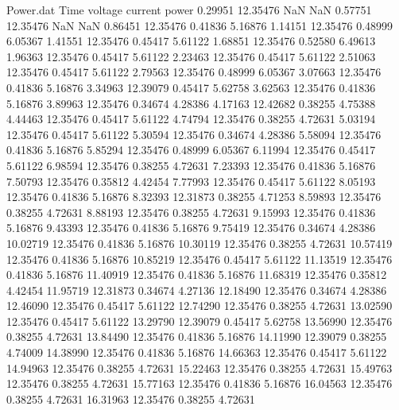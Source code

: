 \begin{filecontents}{Power.dat}
Time voltage current power
   0.29951   12.35476        NaN        NaN
   0.57751   12.35476        NaN        NaN
   0.86451   12.35476    0.41836    5.16876
   1.14151   12.35476    0.48999    6.05367
   1.41551   12.35476    0.45417    5.61122
   1.68851   12.35476    0.52580    6.49613
   1.96363   12.35476    0.45417    5.61122
   2.23463   12.35476    0.45417    5.61122
   2.51063   12.35476    0.45417    5.61122
   2.79563   12.35476    0.48999    6.05367
   3.07663   12.35476    0.41836    5.16876
   3.34963   12.39079    0.45417    5.62758
   3.62563   12.35476    0.41836    5.16876
   3.89963   12.35476    0.34674    4.28386
   4.17163   12.42682    0.38255    4.75388
   4.44463   12.35476    0.45417    5.61122
   4.74794   12.35476    0.38255    4.72631
   5.03194   12.35476    0.45417    5.61122
   5.30594   12.35476    0.34674    4.28386
   5.58094   12.35476    0.41836    5.16876
   5.85294   12.35476    0.48999    6.05367
   6.11994   12.35476    0.45417    5.61122
   6.98594   12.35476    0.38255    4.72631
   7.23393   12.35476    0.41836    5.16876
   7.50793   12.35476    0.35812    4.42454
   7.77993   12.35476    0.45417    5.61122
   8.05193   12.35476    0.41836    5.16876
   8.32393   12.31873    0.38255    4.71253
   8.59893   12.35476    0.38255    4.72631
   8.88193   12.35476    0.38255    4.72631
   9.15993   12.35476    0.41836    5.16876
   9.43393   12.35476    0.41836    5.16876
   9.75419   12.35476    0.34674    4.28386
  10.02719   12.35476    0.41836    5.16876
  10.30119   12.35476    0.38255    4.72631
  10.57419   12.35476    0.41836    5.16876
  10.85219   12.35476    0.45417    5.61122
  11.13519   12.35476    0.41836    5.16876
  11.40919   12.35476    0.41836    5.16876
  11.68319   12.35476    0.35812    4.42454
  11.95719   12.31873    0.34674    4.27136
  12.18490   12.35476    0.34674    4.28386
  12.46090   12.35476    0.45417    5.61122
  12.74290   12.35476    0.38255    4.72631
  13.02590   12.35476    0.45417    5.61122
  13.29790   12.39079    0.45417    5.62758
  13.56990   12.35476    0.38255    4.72631
  13.84490   12.35476    0.41836    5.16876
  14.11990   12.39079    0.38255    4.74009
  14.38990   12.35476    0.41836    5.16876
  14.66363   12.35476    0.45417    5.61122
  14.94963   12.35476    0.38255    4.72631
  15.22463   12.35476    0.38255    4.72631
  15.49763   12.35476    0.38255    4.72631
  15.77163   12.35476    0.41836    5.16876
  16.04563   12.35476    0.38255    4.72631
  16.31963   12.35476    0.38255    4.72631

\end{filecontents}
